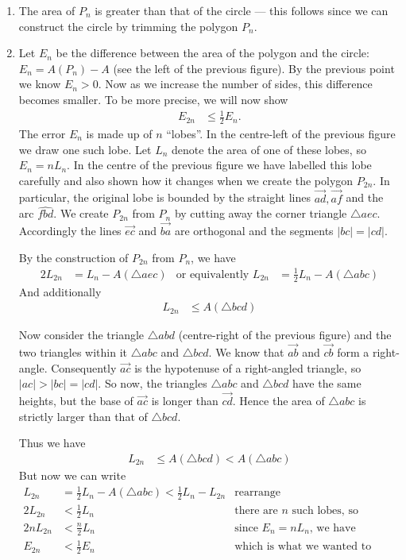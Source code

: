 \begin{enumerate}
 \item The area of $P_n$ is greater than that of the circle --- this follows since we
can construct the circle by trimming the polygon $P_n$.

 \item Let $E_n$ be the difference between the area of the polygon and the circle: $E_n =
A(P_n)-A$ (see the left of the previous figure). By the previous point we know $E_n>0$.
Now as we increase the number of sides, this difference becomes smaller. To be more
precise, we will now show
  \begin{align*}
  E_{2n} & \leq \frac{1}{2} E_n.
  \end{align*}
The error $E_n$ is made up of $n$ ``lobes''. In the centre-left of the previous figure we
draw one such lobe. Let $L_n$ denote the area of one of these lobes, so $E_n = nL_n$.  In
the centre of the previous figure we have labelled this lobe carefully and also shown how
it changes when we create the polygon $P_{2n}$. In particular, the original lobe is
bounded by the straight lines $\vec{ad}, \vec{af}$ and the arc $\widehat{fbd}$. We create
$P_{2n}$ from $P_n$ by cutting away the corner triangle $\triangle aec$. Accordingly the
lines $\vec{ec}$ and $\vec{ba}$ are orthogonal and the segments $|bc|=|cd|$.

By the construction of $P_{2n}$ from $P_n$, we have
\begin{align*}
  2L_{2n} &= L_n - A( \triangle aec) & \text{or equivalently }
  L_{2n} &= \frac{1}{2} L_n - A( \triangle abc)
\end{align*}
And additionally
\begin{align*}
  L_{2n} & \leq A( \triangle bcd)
\end{align*}

Now consider the triangle $\triangle abd$ (centre-right of the previous figure) and the
two triangles within it $\triangle abc$ and $\triangle bcd$. We know that $\vec{ab}$ and
$\vec{cb}$ form a right-angle. Consequently $\vec{ac}$ is the hypotenuse of a right-angled
triangle, so $|ac|>|bc| = |cd|$. So now, the triangles $\triangle abc$ and $\triangle bcd$
have the same heights, but the base of $\vec{ac}$ is longer than $\vec{cd}$. Hence the
area of $\triangle abc$ is strictly larger than that of $\triangle bcd$.

Thus we have
\begin{align*}
  L_{2n} & \leq A(\triangle bcd) < A(\triangle abc)
\end{align*}
But now we can write
\begin{align*}
  L_{2n} &= \frac{1}{2} L_n - A( \triangle abc) < \frac{1}{2} L_n - L_{2n}  &
\text{rearrange}\\
  2L_{2n} &< \frac{1}{2} L_n & \text{there are $n$ such lobes, so } \\
  2n L_{2n} &< \frac{n}{2} L_n & \text{since $E_n = n L_n$, we have}\\
  E_{2n} & < \frac{1}{2} E_n & \text{which is what we wanted to show.}
\end{align*}



\end{enumerate}
